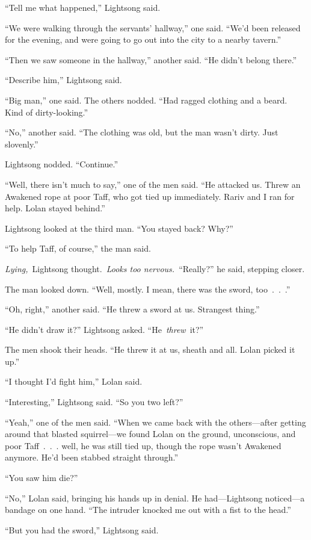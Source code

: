 “Tell me what happened,” Lightsong said.

“We were walking through the servants’ hallway,” one said. “We’d been released for the evening, and were going to go out into the city to a nearby tavern.”

“Then we saw someone in the hallway,” another said. “He didn’t belong there.”

“Describe him,” Lightsong said.

“Big man,” one said. The others nodded. “Had ragged clothing and a beard. Kind of dirty-looking.”

“No,” another said. “The clothing was old, but the man wasn’t dirty. Just slovenly.”

Lightsong nodded. “Continue.”

“Well, there isn’t much to say,” one of the men said. “He attacked us. Threw an Awakened rope at poor Taff, who got tied up immediately. Rariv and I ran for help. Lolan stayed behind.”

Lightsong looked at the third man. “You stayed back? Why?”

“To help Taff, of course,” the man said.

\textit{Lying,}~Lightsong thought.~\textit{Looks too nervous.}~“Really?” he said, stepping closer.

The man looked down. “Well, mostly. I mean, there was the sword, too~.~.~.”

“Oh, right,” another said. “He threw a sword at us. Strangest thing.”

“He didn’t draw it?” Lightsong asked. “He~\textit{threw}~it?”

The men shook their heads. “He threw it at us, sheath and all. Lolan picked it up.”

“I thought I’d fight him,” Lolan said.

“Interesting,” Lightsong said. “So you two left?”

“Yeah,” one of the men said. “When we came back with the others—after getting around that blasted squirrel—we found Lolan on the ground, unconscious, and poor Taff~.~.~. well, he was still tied up, though the rope wasn’t Awakened anymore. He’d been stabbed straight through.”

“You saw him die?”

“No,” Lolan said, bringing his hands up in denial. He had—Lightsong noticed—a bandage on one hand. “The intruder knocked me out with a fist to the head.”

“But you had the sword,” Lightsong said.

